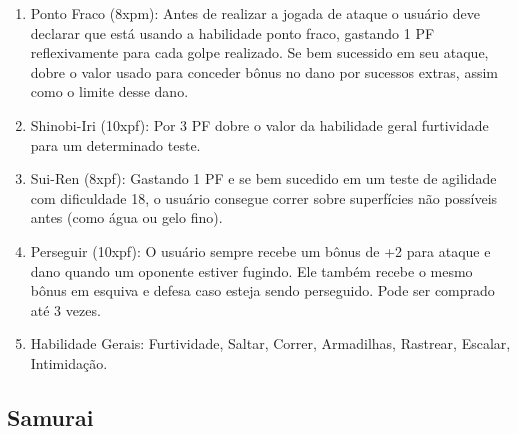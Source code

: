 \begin{enumerate}
	\item Ponto Fraco (8xpm): Antes de realizar a jogada de ataque o usuário deve declarar que está usando a habilidade ponto fraco, gastando 1 PF reflexivamente para cada golpe realizado. Se bem sucessido em seu ataque, dobre o valor usado para conceder bônus no dano por sucessos extras, assim como o limite desse dano.	
	
	\item Shinobi-Iri (10xpf): Por 3 PF dobre o valor da habilidade geral furtividade para um determinado teste.
	
	\item Sui-Ren (8xpf): Gastando 1 PF e se bem sucedido em um teste de agilidade com dificuldade 18, o usuário consegue correr sobre superfícies não possíveis antes (como água ou gelo fino). 
	
	\item Perseguir (10xpf): O usuário sempre recebe um bônus de +2 para ataque e dano quando um oponente estiver fugindo. Ele também recebe o mesmo bônus em esquiva e defesa caso esteja sendo perseguido. Pode ser comprado até 3 vezes.
	
	
	\item Habilidade Gerais: Furtividade, Saltar, Correr, Armadilhas, Rastrear, Escalar, Intimidação.
	
	
\end{enumerate}

 \subsection{Samurai} 
 
